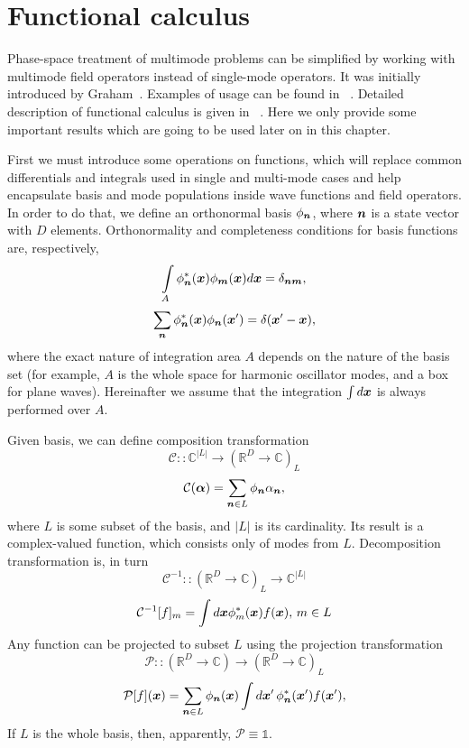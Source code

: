 \section{Functional calculus}

Phase-space treatment of multimode problems can be simplified by working with multimode field operators instead of single-mode operators.
It was initially introduced by Graham~\cite{Graham1970,Graham1970a}.
Examples of usage can be found in ~\cite{Steel1998,Norrie2006a}.
Detailed description of functional calculus is given in~\cite{Dalton2011} .
Here we only provide some important results which are going to be used later on in this chapter.

First we must introduce some operations on functions,
which will replace common differentials and integrals used in single and multi-mode cases and help encapsulate basis and mode populations inside wave functions and field operators.
In order to do that, we define an orthonormal basis $\phi_{\boldsymbol{n}}$,
where $\boldsymbol{n}$ is a state vector with $D$ elements.
Orthonormality and completeness conditions for basis functions are, respectively,
\[
	\int\limits_A \phi_{\boldsymbol{n}}^*(\boldsymbol{x}) \phi_{\boldsymbol{m}}(\boldsymbol{x}) d\boldsymbol{x} = \delta_{\boldsymbol{n}\boldsymbol{m}},
\]
\[
	\sum\limits_{\boldsymbol{n}} \phi_{\boldsymbol{n}}^*(\boldsymbol{x}) \phi_{\boldsymbol{n}}(\boldsymbol{x}^\prime) = \delta(\boldsymbol{x}^\prime - \boldsymbol{x}),
\]
where the exact nature of integration area $A$ depends on the nature of the basis set
(for example, $A$ is the whole space for harmonic oscillator modes, and a box for plane waves).
Hereinafter we assume that the integration $\int d\boldsymbol{x}$ is always performed over $A$.

Given basis, we can define composition transformation
\[
	\mathcal{C} :: \mathbb{C}^{|L|} \rightarrow (\mathbb{R}^D \rightarrow \mathbb{C})_L
\]
\[
	\mathcal{C}(\bm{\alpha}) = \sum\limits_{\boldsymbol{n} \in L} \phi_{\boldsymbol{n}} \alpha_{\boldsymbol{n}},
\]
where $L$ is some subset of the basis,
and $|L|$ is its cardinality.
Its result is a complex-valued function, which consists only of modes from $L$.
Decomposition transformation is, in turn
\[
	\mathcal{C}^{-1} :: (\mathbb{R}^D \rightarrow \mathbb{C})_L \rightarrow \mathbb{C}^{|L|}
\]
\[
	\mathcal{C}^{-1}[f]_m = \int d\boldsymbol{x} \phi_m^*(\boldsymbol{x}) f(\boldsymbol{x}),\,m \in L
\]
Any function can be projected to subset $L$ using the projection transformation
\[
	\mathcal{P} ::
	(\mathbb{R}^D \rightarrow \mathbb{C}) \rightarrow (\mathbb{R}^D \rightarrow \mathbb{C})_L
\]
\begin{equation}
\label{eqn:formalism:func-calculus:projector}
	\mathcal{P}[f](\boldsymbol{x})
	= \sum\limits_{\boldsymbol{n} \in L} \phi_{\boldsymbol{n}} (\boldsymbol{x}) \int
		d\boldsymbol{x}^\prime\, \phi_{\boldsymbol{n}}^*(\boldsymbol{x}^\prime) f(\boldsymbol{x}^\prime),
\end{equation}
If $L$ is the whole basis, then, apparently, $\mathcal{P} \equiv \mathds{1}$.

